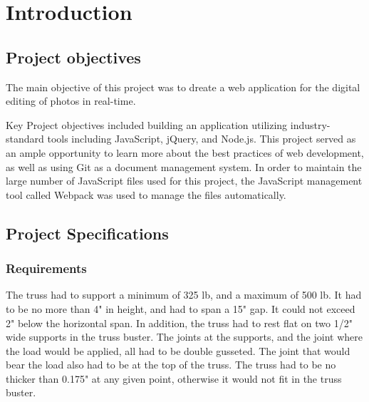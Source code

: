 \documentclass{article}
\let\Oldsection\section
\renewcommand{\section}{\FloatBarrier\Oldsection}
\let\Oldsubsection\subsection
\renewcommand{\subsection}{\FloatBarrier\Oldsubsection}
\let\Oldsubsubsection\subsubsection
\renewcommand{\subsubsection}{\FloatBarrier\Oldsubsubsection}
\begin{document}
  \newpage

  \section{Introduction}

  \subsection{Project objectives}

  The main objective of this project was to dreate a web application for the digital editing of photos in real-time.

  Key Project objectives included building an application utilizing industry-standard tools including JavaScript, jQuery, and Node.js. This project served as an ample opportunity to learn more about the best practices of web development, as well as using Git as a document management system. In order to maintain the large number of JavaScript files used for this project, the JavaScript management tool called Webpack was used to manage the files automatically.

  \subsection{Project Specifications}

  \subsubsection{Requirements}

  The truss had to support a minimum of 325 lb, and a maximum of 500 lb. It had to be no more than 4" in height, and had to span a 15" gap. It could not exceed 2" below the horizontal span. In addition, the truss had to rest flat on two 1/2" wide supports in the truss buster. The joints at the supports, and the joint where the load would be applied, all had to be double gusseted. The joint that would bear the load also had to be at the top of the truss. The truss had to be no thicker than 0.175" at any given point, otherwise it would not fit in the truss buster.
\end{document}
